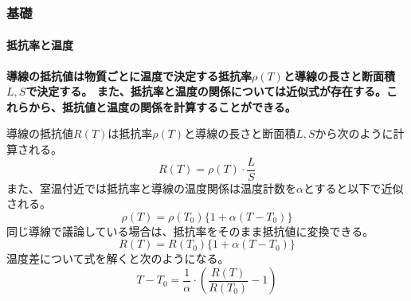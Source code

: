 \documentclass[dvipdfmx, 8pt, aspectratio=169]{beamer}
\begin{document}
\begin{frame}[t]
  \frametitle{基礎}
  \framesubtitle{抵抗率と温度}

  \textcolor{mri-blue}{
  \textbf{導線の抵抗値は物質ごとに温度で決定する抵抗率$\rho(T)$と導線の長さと断面積$L, S$で決定する。
  また、抵抗率と温度の関係については近似式が存在する。これらから、抵抗値と温度の関係を計算することができる。
  \vspace{1zh}
  }
  }

  導線の抵抗値$R(T)$は抵抗率$\rho(T)$と導線の長さと断面積$L, S$から次のように計算される。
  \begin{equation}
    R(T) = \rho(T) \cdot \frac{L}{S}
  \end{equation}
  また、室温付近では抵抗率と導線の温度関係は温度計数を$\alpha$とすると以下で近似される。
  \begin{equation}
    \rho(T) = \rho(T_{0}) \{ 1 + \alpha (T-T_{0}) \}
  \end{equation}
  同じ導線で議論している場合は、抵抗率をそのまま抵抗値に変換できる。
  \begin{equation}
    R(T) = R(T_{0}) \{ 1 + \alpha (T-T_{0}) \}
  \end{equation}
  温度差について式を解くと次のようになる。
  \begin{equation}
    T-T_{0} = \frac{1}{\alpha} \cdot \left( \frac{R(T)}{R(T_{0})} - 1 \right)
  \end{equation}

\end{frame}
\end{document}
